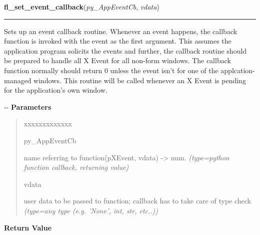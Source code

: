     \label{xformslib:flxbasic:fl_set_event_callback}

    \vspace{0.5ex}

\hspace{.8\funcindent}\begin{boxedminipage}{\funcwidth}

    \raggedright \textbf{fl\_set\_event\_callback}(\textit{py\_AppEventCb}, \textit{vdata})

    \vspace{-1.5ex}

    \rule{\textwidth}{0.5\fboxrule}
\setlength{\parskip}{2ex}

Sets up an event callback routine. Whenever an event happens, the
callback function is invoked with the event as the first argument.
This assumes the application program solicits the events and further,
the callback routine should be prepared to handle all X Event for all
non-form windows. The callback function normally should return 0
unless the event isn't for one of the applcation-managed windows.
This routine will be called whenever an X Event is pending for the
application's own window.

-{}-
\setlength{\parskip}{1ex}
      \textbf{Parameters}
      \vspace{-1ex}

      \begin{quote}
        \begin{Ventry}{xxxxxxxxxxxxx}

          \item[py\_AppEventCb]


name referring to function(pXEvent, vdata) -> num.
            {\it (type=python function callback, returning value)}

          \item[vdata]


user data to be passed to function; callback has to take care of
type check
            {\it (type=any type (e.g. 'None', int, str, etc..))}

        \end{Ventry}

      \end{quote}

      \textbf{Return Value}
    \vspace{-1ex}


\end{boxedminipage}
